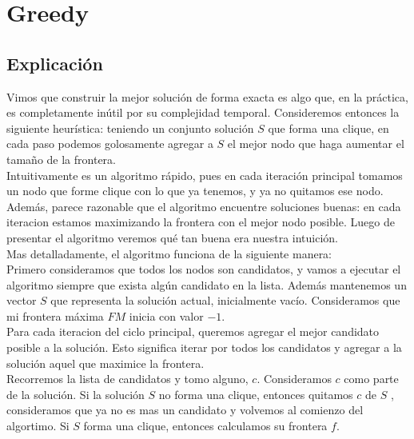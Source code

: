
\section{Greedy}

\subsection{Explicación}

Vimos que construir la mejor solución de forma exacta es algo que, en la práctica, es completamente inútil por su complejidad temporal. Consideremos entonces la siguiente heurística: teniendo un conjunto solución $S$ que forma una clique, en cada paso podemos golosamente agregar a $S$ el mejor nodo que haga aumentar el tamaño de la frontera. \\

Intuitivamente es un algoritmo rápido, pues en cada iteración principal tomamos un nodo que forme clique con lo que ya tenemos, y ya no quitamos ese nodo. Además, parece razonable que el algoritmo encuentre soluciones buenas: en cada iteracion estamos maximizando la frontera con el mejor nodo posible. Luego de presentar el algoritmo veremos qué tan buena era nuestra intuición. \\

Mas detalladamente, el algoritmo funciona de la siguiente manera: \\

Primero consideramos que todos los nodos son candidatos, y vamos a ejecutar el algoritmo siempre que exista algún candidato en la lista. Además mantenemos un vector $S$ que representa la solución actual, inicialmente vacío. Consideramos que mi frontera máxima $FM$ inicia con valor $-1$. \\

Para cada iteracion del ciclo principal, queremos agregar el mejor candidato posible a la solución. Esto significa iterar por todos los candidatos y agregar a la solución aquel que maximice la frontera. \\

Recorremos la lista de candidatos y tomo alguno, $c$. Consideramos $c$ como parte de la solución. Si la solución $S$ no forma una clique, entonces quitamos $c$ de $S$ , consideramos que ya no es mas un candidato y volvemos al comienzo del algortimo. Si $S$ forma una clique, entonces calculamos su frontera $f$. \\


